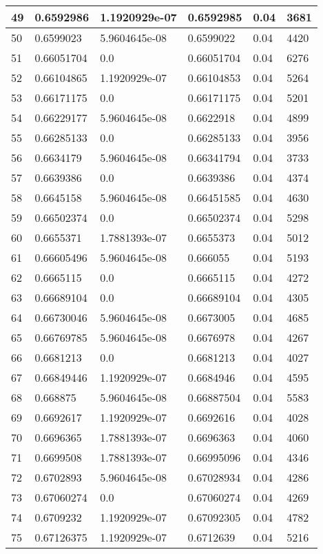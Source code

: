 \begin{longtable}{|l|l|l|l|l|l|}
49 & 0.6592986 & 1.1920929e-07 & 0.6592985 & 0.04 & 3681 \\ \hline 
50 & 0.6599023 & 5.9604645e-08 & 0.6599022 & 0.04 & 4420 \\ \hline 
51 & 0.66051704 & 0.0 & 0.66051704 & 0.04 & 6276 \\ \hline 
52 & 0.66104865 & 1.1920929e-07 & 0.66104853 & 0.04 & 5264 \\ \hline 
53 & 0.66171175 & 0.0 & 0.66171175 & 0.04 & 5201 \\ \hline 
54 & 0.66229177 & 5.9604645e-08 & 0.6622918 & 0.04 & 4899 \\ \hline 
55 & 0.66285133 & 0.0 & 0.66285133 & 0.04 & 3956 \\ \hline 
56 & 0.6634179 & 5.9604645e-08 & 0.66341794 & 0.04 & 3733 \\ \hline 
57 & 0.6639386 & 0.0 & 0.6639386 & 0.04 & 4374 \\ \hline 
58 & 0.6645158 & 5.9604645e-08 & 0.66451585 & 0.04 & 4630 \\ \hline 
59 & 0.66502374 & 0.0 & 0.66502374 & 0.04 & 5298 \\ \hline 
60 & 0.6655371 & 1.7881393e-07 & 0.6655373 & 0.04 & 5012 \\ \hline 
61 & 0.66605496 & 5.9604645e-08 & 0.666055 & 0.04 & 5193 \\ \hline 
62 & 0.6665115 & 0.0 & 0.6665115 & 0.04 & 4272 \\ \hline 
63 & 0.66689104 & 0.0 & 0.66689104 & 0.04 & 4305 \\ \hline 
64 & 0.66730046 & 5.9604645e-08 & 0.6673005 & 0.04 & 4685 \\ \hline 
65 & 0.66769785 & 5.9604645e-08 & 0.6676978 & 0.04 & 4267 \\ \hline 
66 & 0.6681213 & 0.0 & 0.6681213 & 0.04 & 4027 \\ \hline 
67 & 0.66849446 & 1.1920929e-07 & 0.6684946 & 0.04 & 4595 \\ \hline 
68 & 0.668875 & 5.9604645e-08 & 0.66887504 & 0.04 & 5583 \\ \hline 
69 & 0.6692617 & 1.1920929e-07 & 0.6692616 & 0.04 & 4028 \\ \hline 
70 & 0.6696365 & 1.7881393e-07 & 0.6696363 & 0.04 & 4060 \\ \hline 
71 & 0.6699508 & 1.7881393e-07 & 0.66995096 & 0.04 & 4346 \\ \hline 
72 & 0.6702893 & 5.9604645e-08 & 0.67028934 & 0.04 & 4286 \\ \hline 
73 & 0.67060274 & 0.0 & 0.67060274 & 0.04 & 4269 \\ \hline 
74 & 0.6709232 & 1.1920929e-07 & 0.67092305 & 0.04 & 4782 \\ \hline 
75 & 0.67126375 & 1.1920929e-07 & 0.6712639 & 0.04 & 5216 \\ \hline 
\end{longtable}